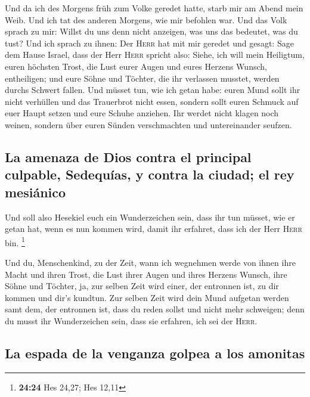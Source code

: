  Und da ich des Morgens früh zum Volke geredet hatte,
starb mir am Abend mein Weib. Und ich tat des anderen Morgens, wie mir
befohlen war.  Und das Volk sprach zu mir: Willst du uns
denn nicht anzeigen, was uns das bedeutet, was du tust? 
Und ich sprach zu ihnen: Der \textsc{Herr} hat mit mir geredet und
gesagt:  Sage dem Hause Israel, dass der Herr
\textsc{Herr} spricht also: Siehe, ich will mein Heiligtum, euren
höchsten Trost, die Lust eurer Augen und eures Herzens Wunsch,
entheiligen; und eure Söhne und Töchter, die ihr verlassen musstet,
werden durchs Schwert fallen.  Und müsset tun, wie ich
getan habe: euren Mund sollt ihr nicht verhüllen und das Trauerbrot
nicht essen,  sondern sollt euren Schmuck auf euer Haupt
setzen und eure Schuhe anziehen. Ihr werdet nicht klagen noch weinen,
sondern über euren Sünden verschmachten und untereinander seufzen.

\hypertarget{la-amenaza-de-dios-contra-el-principal-culpable-sedequuxedas-y-contra-la-ciudad-el-rey-mesiuxe1nico}{%
\subsection{La amenaza de Dios contra el principal culpable, Sedequías,
y contra la ciudad; el rey
mesiánico}\label{la-amenaza-de-dios-contra-el-principal-culpable-sedequuxedas-y-contra-la-ciudad-el-rey-mesiuxe1nico}}

 Und soll also Hesekiel euch ein Wunderzeichen sein, dass
ihr tun müsset, wie er getan hat, wenn es nun kommen wird, damit ihr
erfahret, dass ich der Herr \textsc{Herr} bin. \footnote{\textbf{24:24}
  Hes 24,27; Hes 12,11}

 Und du, Menschenkind, zu der Zeit, wann ich wegnehmen
werde von ihnen ihre Macht und ihren Trost, die Lust ihrer Augen und
ihres Herzens Wunsch, ihre Söhne und Töchter,  ja, zur
selben Zeit wird einer, der entronnen ist, zu dir kommen und dir's
kundtun.  Zur selben Zeit wird dein Mund aufgetan werden
samt dem, der entronnen ist, dass du reden sollst und nicht mehr
schweigen; denn du musst ihr Wunderzeichen sein, dass sie erfahren, ich
sei der \textsc{Herr}.

\hypertarget{la-espada-de-la-venganza-golpea-a-los-amonitas}{%
\subsection{La espada de la venganza golpea a los
amonitas}\label{la-espada-de-la-venganza-golpea-a-los-amonitas}}

